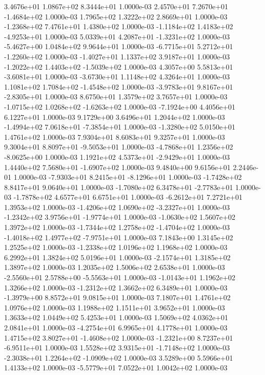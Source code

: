 3.4676e+01 1.0867e+02 8.3444e+01  1.0000e-03
 2.4570e+01  7.2670e+01 -1.4684e+02  1.0000e-03
1.7965e+02 1.3222e+02 2.8669e+01  1.0000e-03
-1.2368e+02  7.4761e+01  1.4380e+02  1.0000e-03
-1.1184e+02  1.4183e+02 -4.9253e+01  1.0000e-03
 5.0339e+01  4.2087e+01 -1.3231e+02  1.0000e-03
-5.4627e+00  1.0484e+02  9.9644e+01  1.0000e-03
-6.7715e+01  5.2712e+01 -1.2260e+02  1.0000e-03
-1.4027e+01  1.1337e+02  3.9187e+01  1.0000e-03
-1.2022e+02  1.4403e+02 -1.5039e+02  1.0000e-03
 4.3057e+00  5.5813e+01 -3.6081e+01  1.0000e-03
-3.6730e+01  1.1148e+02  4.3264e+01  1.0000e-03
 1.1081e+02  1.7084e+02 -1.4548e+02  1.0000e-03
-3.9783e+01  9.8167e+01 -2.8305e+01  1.0000e-03
8.6750e+01 1.3579e+02 3.7657e+01  1.0000e-03
-1.0715e+02  1.0268e+02 -1.6263e+02  1.0000e-03
-7.1924e+00  4.4056e+01  6.1227e+01  1.0000e-03
9.1729e+00 3.6496e+01 1.2044e+02  1.0000e-03
-1.4994e+02  7.0618e+01 -7.3854e+01  1.0000e-03
-1.3280e+02  5.0150e+01  1.4761e+02  1.0000e-03
7.9304e+01 8.6083e+01 9.3257e+01  1.0000e-03
 9.3004e+01  8.8097e+01 -9.5053e+01  1.0000e-03
-4.7868e+01  1.2356e+02 -8.0625e+00  1.0000e-03
 1.1921e+02  4.5373e+01 -2.9429e+01  1.0000e-03
 1.4440e+02  7.5680e+01 -1.6907e+02  1.0000e-03
9.4840e+00 9.6156e+01 2.2446e-01  1.0000e-03
-7.9303e+01  8.2415e+01 -8.1296e+01  1.0000e-03
-1.7428e+02  8.8417e+01  9.0640e+01  1.0000e-03
-1.7080e+02  6.3478e+01 -2.7783e+01  1.0000e-03
-1.7878e+02  4.6577e+01  6.6751e+01  1.0000e-03
-6.2612e+01  7.2721e+01  1.3953e+02  1.0000e-03
-1.4206e+02  1.0690e+02 -3.2327e+01  1.0000e-03
-1.2342e+02  3.9756e+01 -1.9774e+01  1.0000e-03
-1.0630e+02  1.5607e+02  1.3972e+02  1.0000e-03
-1.7344e+02  1.2758e+02 -1.4704e+02  1.0000e-03
-1.4018e+02  1.4977e+02 -7.9751e+01  1.0000e-03
7.1843e+00 1.3145e+02 1.2525e+02  1.0000e-03
-1.2338e+02  1.0196e+02  1.1968e+02  1.0000e-03
6.2992e+01 1.3824e+02 5.0196e+01  1.0000e-03
-2.1574e+01  1.3185e+02  1.3897e+02  1.0000e-03
1.2035e+02 1.5006e+02 2.6538e+01  1.0000e-03
-2.5560e+01  2.5788e+00 -5.5563e+01  1.0000e-03
-1.0143e+01  1.1962e+02  1.3266e+02  1.0000e-03
-1.2312e+02  1.3662e+02  6.3489e+01  1.0000e-03
-1.3979e+00  8.8572e+01  9.0815e+01  1.0000e-03
7.1807e+01 1.4761e+02 1.0976e+02  1.0000e-03
1.1988e+02 1.1511e+01 3.9652e+01  1.0000e-03
1.3633e+02 1.0449e+02 5.4253e+01  1.0000e-03
1.5069e+02 4.0362e+01 2.0841e+01  1.0000e-03
-4.2754e+01  6.9965e+01  4.1778e+01  1.0000e-03
 1.4715e+02  3.8027e+01 -1.4608e+02  1.0000e-03
-1.2321e+00  8.7237e+01 -6.9511e+01  1.0000e-03
 1.5528e+02  3.9315e+01 -1.7148e+02  1.0000e-03
-2.3038e+01  1.2264e+02 -1.0909e+02  1.0000e-03
3.5289e+00 5.5966e+01 1.4133e+02  1.0000e-03
-5.5779e+01  7.0522e+01  1.0042e+02  1.0000e-03
